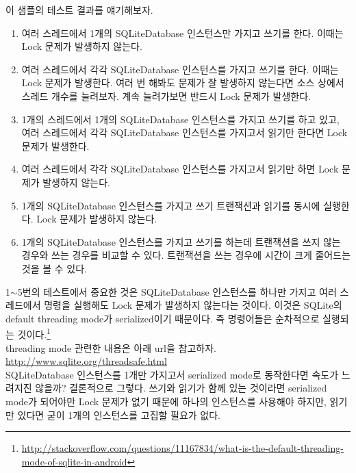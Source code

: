 이 샘플의 테스트 결과를 얘기해보자.
\begin{enumerate}
\item 여러 스레드에서 1개의 SQLiteDatabase 인스턴스만 가지고 쓰기를 한다. 이때는 Lock 문제가 발생하지 않는다. 

\item 여러 스레드에서 각각 SQLiteDatabase 인스턴스를 가지고 쓰기를 한다. 이때는 Lock 문제가 발생한다. 여러 번 해봐도 문제가 잘 발생하지 않는다면 소스 상에서 스레드 개수를 늘려보자. 계속 늘려가보면 반드시 Lock 문제가 발생한다.

\item 1개의 스레드에서 1개의 SQLiteDatabase 인스턴스를 가지고 쓰기를 하고 있고, 여러 스레드에서 각각 SQLiteDatabase 인스턴스를 가지고서 읽기만 한다면 Lock 문제가 발생한다.

\item 여러 스레드에서 각각 SQLiteDatabase 인스턴스를 가지고서 읽기만 하면 Lock 문제가 발생하지 않는다.

\item 1개의 SQLiteDatabase 인스턴스를 가지고 쓰기 트랜잭션과 읽기를 동시에 실행한다. Lock 문제가 발생하지 않는다.

\item 1개의 SQLiteDatabase 인스턴스를 가지고 쓰기를 하는데 트랜잭션을 쓰지 않는 경우와 쓰는 경우를 비교할 수 있다. 트랜잭션을 쓰는 경우에 시간이 크게 줄어드는 것을 볼 수 있다.

\end{enumerate}

1$\sim$5번의 테스트에서 중요한 것은  SQLiteDatabase 인스턴스를 하나만 가지고 여러 스레드에서 명령을 실행해도 Lock 문제가 발생하지 않는다는 것이다. 이것은 SQLite의 default threading mode가 serialized이기 때문이다. 즉 명령어들은 순차적으로 실행되는 것이다.\footnote{\url{http://stackoverflow.com/questions/11167834/what-is-the-default-threading-mode-of-sqlite-in-android}}\\

threading mode 관련한 내용은 아래 url을 참고하자.\\
\url{http://www.sqlite.org/threadsafe.html}\\

SQLiteDatabase 인스턴스를 1개만 가지고서 serialized mode로 동작한다면 속도가 느려지진 않을까? 결론적으로 그렇다.
쓰기와 읽기가 함께 있는 것이라면 serialized mode가 되어야만 Lock 문제가 없기 때문에 하나의 인스턴스를 사용해야 하지만, 읽기만 있다면 굳이 1개의 인스턴스를 고집할 필요가 없다.\\

